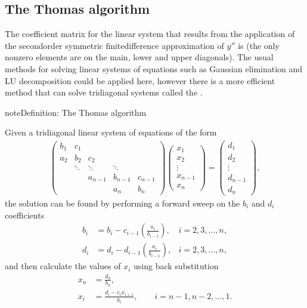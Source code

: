 \documentclass[letterpaper,10pt,english]{jupyterBook}
\begin{document}
\subsection{The Thomas algorithm}
\label{\detokenize{5_BVPs/5.2_Finite_difference_method:the-thomas-algorithm}}\label{\detokenize{5_BVPs/5.2_Finite_difference_method:thomas-algorithm-section}}
\sphinxAtStartPar
The coefficient matrix for the linear system that results from the application of the second\sphinxhyphen{}order symmetric finite\sphinxhyphen{}difference approximation of \(y''\) is  (the only non\sphinxhyphen{}zero elements are on the main, lower and upper diagonals). The usual methods for solving linear systems of equations such as Gaussian elimination and LU decomposition could be applied here, however there is a more efficient method that can solve tridiagonal systems called the .

\begin{sphinxadmonition}{note}{Definition: The Thomas algorithm}

\sphinxAtStartPar
Given a tridiagonal linear system of equations of the form
\begin{align*}
    \begin{pmatrix} 
        b_1 & c_1 \\
        a_2 & b_2 & c_2 \\
        & \ddots & \ddots & \ddots \\
        & & a_{n-1} & b_{n-1} & c_{n-1} \\
        & & & a_n & b_n
    \end{pmatrix}
    \begin{pmatrix} x_1 \\ x_2 \\ \vdots \\ x_{n-1} \\ x_n \end{pmatrix} =
    \begin{pmatrix} d_1 \\ d_2 \\ \vdots \\ d_{n-1} \\ d_n \end{pmatrix},
\end{align*}
\sphinxAtStartPar
the solution can be found by performing a forward sweep on the \(b_i\) and \(d_i\) coefficients
\begin{align*}
    b_i &= b_i - c_{i-1} \left( \frac{a_i}{b_{i-1}} \right), & i = 2, 3, \ldots, n, \\
    d_i &= d_i - d_{i-1} \left( \frac{a_i}{b_{i-1}} \right), & i = 2, 3, \ldots, n, 
\end{align*}
\sphinxAtStartPar
and then calculate the values of \(x_i\) using back substitution
\begin{align*}
    x_n &= \frac{d_n}{b_n}, \\
    x_i &= \frac{d_i - c_i x_{i+1}}{b_i}, \qquad i = n-1, n-2, \ldots, 1.
\end{align*}\end{sphinxadmonition}
\end{document}
